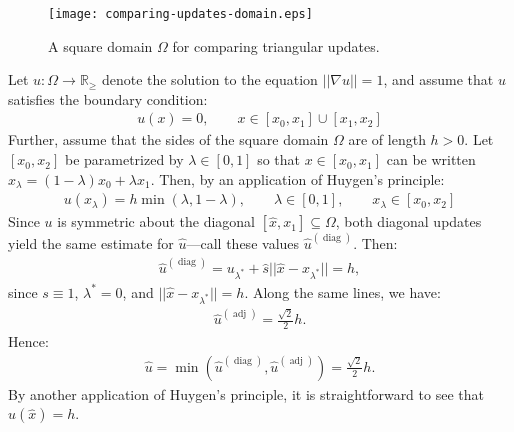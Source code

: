 \documentclass{article}
\begin{document}
\large

\begin{figure}[h]
  \centering
  \texttt{[image: comparing-updates-domain.eps]}
  \caption{A square domain $\Omega$ for comparing triangular
    updates.}\label{fig:comparing-updates-domain}
\end{figure}

Let $u : \Omega \to \mathbb{R}_{\geq}$ denote the solution to the
equation $||\nabla u|| = 1$, and assume that $u$ satisfies the
boundary condition:
\begin{align}
  u(x) = 0, \qquad x \in [x_0, x_1] \cup [x_1, x_2]
\end{align}
Further, assume that the sides of the square domain $\Omega$ are of
length $h > 0$. Let $[x_0, x_2]$ be parametrized by
$\lambda \in [0, 1]$ so that $x \in [x_0, x_1]$ can be written
$x_\lambda = (1 - \lambda) x_0 + \lambda x_1$. Then, by an application of Huygen's
principle:
\begin{align}
  u(x_\lambda) = h \min(\lambda, 1 - \lambda), \qquad \lambda \in [0, 1], \qquad x_\lambda \in [x_0, x_2]
\end{align}
Since $u$ is symmetric about the diagonal
$[\hat{x}, x_1] \subseteq \Omega$, both diagonal updates yield the
same estimate for $\hat{u}$---call these values
$\hat{u}^{(\operatorname{diag})}$. Then:
\begin{align}
  \hat{u}^{(\operatorname{diag})} = u_{\lambda^*} + \hat{s} ||\hat{x} - x_{\lambda^*}|| = h,
\end{align}
since $s \equiv 1$, $\lambda^* = 0$, and
$||\hat{x} - x_{\lambda^*}|| = h$. Along the same lines, we have:
\begin{align}
  \hat{u}^{(\operatorname{adj})} = \frac{\sqrt{2}}{2} h.
\end{align}
Hence:
\begin{align}
  \hat{u} = \min(\hat{u}^{(\operatorname{diag})}, \hat{u}^{(\operatorname{adj})}) = \frac{\sqrt{2}}{2} h.
\end{align}
By another application of Huygen's principle, it is straightforward to
see that $u(\hat{x}) = h$.
\end{document}
